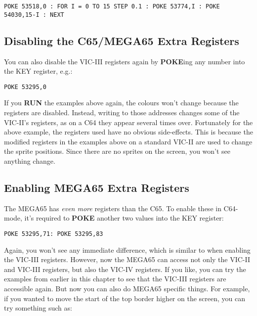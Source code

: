 \begin{tcolorbox}[colback=black,coltext=white]
\verbatimfont{\codefont}
\begin{verbatim}
POKE 53518,0 : FOR I = 0 TO 15 STEP 0.1 : POKE 53774,I : POKE 54030,15-I : NEXT
\end{verbatim}
\end{tcolorbox}

\subsection{Disabling the C65/MEGA65 Extra Registers}

You can also disable the VIC-III registers again by {\bf POKE}ing any number into the KEY register, e.g.:

\begin{tcolorbox}[colback=black,coltext=white]
\verbatimfont{\codefont}
\begin{verbatim}
POKE 53295,0
\end{verbatim}
\end{tcolorbox}

If you {\bf RUN} the examples above again, the colours won't change because
the registers are disabled. Instead, writing to those addresses changes some of the VIC-II's registers,
as on a C64 they appear several times over.  Fortunately for the above example, the registers used have no obvious
side-effects. This is because the modified registers in the examples above on a standard VIC-II are used to change the
sprite positions. Since there are no sprites on the screen, you won't see anything change.

\subsection{Enabling MEGA65 Extra Registers}

The MEGA65 has \textit{even more} registers than the C65.  To enable these in C64-mode, it's required to {\bf POKE} another
two values into the KEY register:

\begin{tcolorbox}[colback=black,coltext=white]
\verbatimfont{\codefont}
\begin{verbatim}
POKE 53295,71: POKE 53295,83
\end{verbatim}
\end{tcolorbox}

Again, you won't see any immediate difference, which is similar to when enabling the VIC-III registers.  However, now the
MEGA65 can access not only the VIC-II and VIC-III registers, but also the VIC-IV registers.  If you like,
you can try the examples from earlier in this chapter to see that the VIC-III registers are accessible again.
But now you can also do MEGA65 specific things. For example, if you wanted to move the start of the top border higher
on the screen, you can try something such as:

